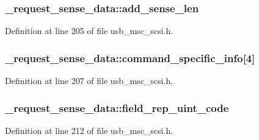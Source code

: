\subsubsection[{\texorpdfstring{add\+\_\+sense\+\_\+len}{add_sense_len}}]{ \+\_\+request\+\_\+sense\+\_\+data\+::add\+\_\+sense\+\_\+len}\hypertarget{struct__request__sense__data_a5efbb08e2b83d955968e4e072d012654}{}\label{struct__request__sense__data_a5efbb08e2b83d955968e4e072d012654}


Definition at line 205 of file usb\+\_\+msc\+\_\+scsi.\+h.

\subsubsection[{\texorpdfstring{command\+\_\+specific\+\_\+info}{command_specific_info}}]{ \+\_\+request\+\_\+sense\+\_\+data\+::command\+\_\+specific\+\_\+info\mbox{[}4\mbox{]}}\hypertarget{struct__request__sense__data_a77200b057859445b03ebaf8aa054866b}{}\label{struct__request__sense__data_a77200b057859445b03ebaf8aa054866b}


Definition at line 207 of file usb\+\_\+msc\+\_\+scsi.\+h.

\subsubsection[{\texorpdfstring{field\+\_\+rep\+\_\+uint\+\_\+code}{field_rep_uint_code}}]{ \+\_\+request\+\_\+sense\+\_\+data\+::field\+\_\+rep\+\_\+uint\+\_\+code}\hypertarget{struct__request__sense__data_a0eb177c02fafa46559ec7618b2c229c7}{}\label{struct__request__sense__data_a0eb177c02fafa46559ec7618b2c229c7}


Definition at line 212 of file usb\+\_\+msc\+\_\+scsi.\+h.

